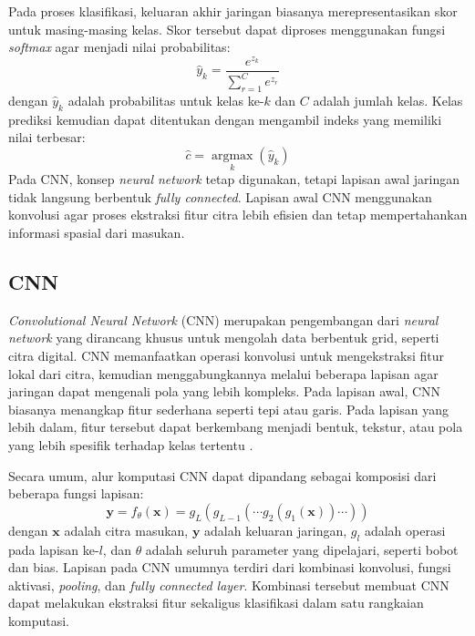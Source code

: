     Pada proses klasifikasi, keluaran akhir jaringan biasanya merepresentasikan skor untuk masing-masing kelas. Skor tersebut dapat diproses menggunakan fungsi \emph{softmax} agar menjadi nilai probabilitas:
    \begin{equation}
        \hat{y}_k =
        \frac{e^{z_k}}
        {\sum_{r=1}^{C} e^{z_r}}
        \label{eq:softmax}
    \end{equation}
    dengan $\hat{y}_k$ adalah probabilitas untuk kelas ke-$k$ dan $C$ adalah jumlah kelas. Kelas prediksi kemudian dapat ditentukan dengan mengambil indeks yang memiliki nilai terbesar:
    \begin{equation}
        \hat{c} =
        \operatorname*{argmax}_{k}(\hat{y}_k)
        \label{eq:argmax}
    \end{equation}
    Pada CNN, konsep \emph{neural network} tetap digunakan, tetapi lapisan awal jaringan tidak langsung berbentuk \emph{fully connected}. Lapisan awal CNN menggunakan konvolusi agar proses ekstraksi fitur citra lebih efisien dan tetap mempertahankan informasi spasial dari masukan.

    \subsection{CNN}
    \emph{Convolutional Neural Network} (CNN) merupakan pengembangan dari \emph{neural network} yang dirancang khusus untuk mengolah data berbentuk grid, seperti citra digital. CNN memanfaatkan operasi konvolusi untuk mengekstraksi fitur lokal dari citra, kemudian menggabungkannya melalui beberapa lapisan agar jaringan dapat mengenali pola yang lebih kompleks. Pada lapisan awal, CNN biasanya menangkap fitur sederhana seperti tepi atau garis. Pada lapisan yang lebih dalam, fitur tersebut dapat berkembang menjadi bentuk, tekstur, atau pola yang lebih spesifik terhadap kelas tertentu \cite{Lecun1998GradientBasedLearning,Goodfellow2016DeepLearning}.

    Secara umum, alur komputasi CNN dapat dipandang sebagai komposisi dari beberapa fungsi lapisan:
    \begin{equation}
        \mathbf{y} =
        f_{\theta}(\mathbf{x}) =
        g_L \left(
        g_{L-1}
        \left(
        \cdots
        g_2
        \left(
        g_1(\mathbf{x})
        \right)
        \cdots
        \right)
        \right)
        \label{eq:cnn_composition}
    \end{equation}
    dengan $\mathbf{x}$ adalah citra masukan, $\mathbf{y}$ adalah keluaran jaringan, $g_l$ adalah operasi pada lapisan ke-$l$, dan $\theta$ adalah seluruh parameter yang dipelajari, seperti bobot dan bias. Lapisan pada CNN umumnya terdiri dari kombinasi konvolusi, fungsi aktivasi, \emph{pooling}, dan \emph{fully connected layer}. Kombinasi tersebut membuat CNN dapat melakukan ekstraksi fitur sekaligus klasifikasi dalam satu rangkaian komputasi.

